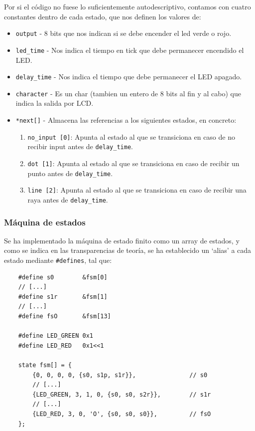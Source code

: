 \documentclass[a4paper,openright,12pt]{article}
\begin{document}
Por si el código no fuese lo suficientemente autodescriptivo, contamos con cuatro constantes dentro de cada estado, que nos definen los valores de:
\begin{itemize}
    \item \texttt{output} - 8 bits que nos indican si se debe encender el led verde o rojo.
    \item \texttt{led\_time} - Nos indica el tiempo en tick que debe permanecer encendido el LED.
    \item \texttt{delay\_time} - Nos indica el tiempo que debe permanecer el LED apagado.
    \item \texttt{character} - Es un char (tambien un entero de 8 bits al fin y al cabo) que indica la salida por LCD.
    \item \texttt{*next[]} - Almacena las referencias a los siguientes estados, en concreto: \begin{enumerate}
        \item \texttt{no\_input [0]}: Apunta al estado al que se transiciona en caso de no recibir input antes de \texttt{delay\_time}.
        \item \texttt{dot [1]}: Apunta al estado al que se transiciona en caso de recibir un punto antes de \texttt{delay\_time}.
        \item \texttt{line [2]}: Apunta al estado al que se transiciona en caso de recibir una raya antes de \texttt{delay\_time}.
    \end{enumerate}
\end{itemize}


\subsubsection{Máquina de estados}
Se ha implementado la máquina de estado finito como un array de estados, y como se indica en las transparencias de teoría, se ha establecido un `alias' a cada estado
mediante \texttt{\#defines}, tal que:
\begin{verbatim}
    #define s0        &fsm[0]
    // [...]
    #define s1r       &fsm[1]
    // [...]
    #define fsO       &fsm[13]

    #define LED_GREEN 0x1
    #define LED_RED   0x1<<1

    state fsm[] = {
        {0, 0, 0, 0, {s0, s1p, s1r}},               // s0
        // [...]
        {LED_GREEN, 3, 1, 0, {s0, s0, s2r}},        // s1r
        // [...]
        {LED_RED, 3, 0, 'O', {s0, s0, s0}},         // fsO
    };
\end{verbatim}
\end{document}
